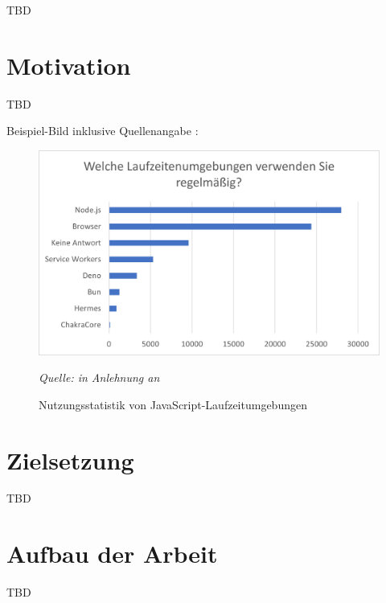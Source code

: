 \pagestyle{fancy-style}
 \label{ch:introduction}
TBD

\section{Motivation} \label{sec:introduction-motivation}
TBD

Beispiel-Bild inklusive Quellenangabe : 
\begin{figure}[h]
	\centering
	\includegraphics[width=\linewidth]{./images/WhichRuntimesDoYouUseRegularly}
	\caption{Nutzungsstatistik von JavaScript-Laufzeitumgebungen}
	\label{fig:runtime-share}
	\textit{Quelle: in Anlehnung an \cite{Greif.2022}}
\end{figure}

\section{Zielsetzung} \label{sec:introduction-target}
TBD

\section{Aufbau der Arbeit} \label{sec:introduction-overview}
TBD